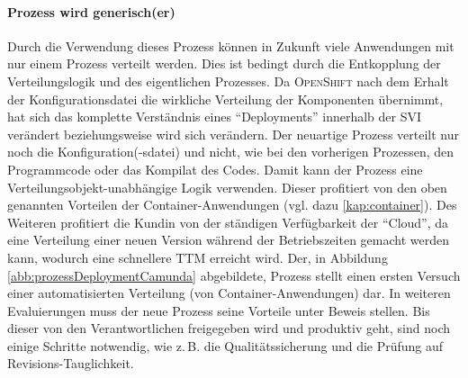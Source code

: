 \paragraph{Prozess wird generisch(er)} Durch die Verwendung dieses Prozess können in Zukunft viele Anwendungen mit nur einem Prozess verteilt werden. Dies ist bedingt durch die Entkopplung der Verteilungslogik und des eigentlichen Prozesses. Da \textsc{OpenShift} nach dem Erhalt der Konfigurationsdatei die wirkliche Verteilung der Komponenten übernimmt, hat sich das komplette Verständnis eines \enquote{Deployments} innerhalb der \ac{SVI} verändert beziehungsweise wird sich verändern. Der neuartige Prozess verteilt nur noch die Konfiguration(-sdatei) und nicht, wie bei den vorherigen Prozessen, den Programmcode oder das Kompilat des Codes. Damit kann der Prozess eine Verteilungsobjekt-unabhängige Logik verwenden. Dieser profitiert von den oben genannten Vorteilen der Container-Anwendungen (vgl. dazu \vref{kap:container}). Des Weiteren profitiert die Kundin von der ständigen Verfügbarkeit der \enquote{Cloud}, da eine Verteilung einer neuen Version während der Betriebszeiten gemacht werden kann, wodurch eine schnellere \ac{TTM} erreicht wird. Der, in Abbildung \vref{abb:prozessDeploymentCamunda} abgebildete, Prozess stellt einen ersten Versuch einer automatisierten Verteilung (von Container-Anwendungen) dar. In weiteren Evaluierungen muss der neue Prozess seine Vorteile unter Beweis stellen. Bis dieser von den Verantwortlichen freigegeben wird und produktiv geht, sind noch einige Schritte notwendig, wie z.\,B. die Qualitätssicherung und die Prüfung auf Revisions-Tauglichkeit.

